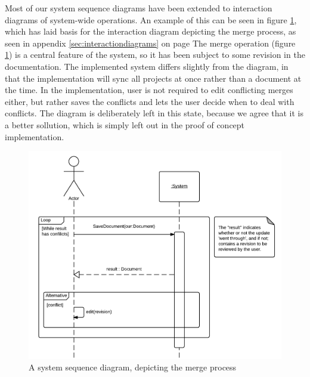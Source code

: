 Most of our system sequence diagrams have been extended to interaction diagrams of system-wide operations. 
An example of this can be seen in figure \ref{fig:merge-ssd}, 
which has laid basis for the interaction diagram depicting the merge process, 
as seen in appendix \ref{sec:interactiondiagrams} on page \pageref{fig:interaction-merge-diagram}
The merge operation (figure \ref{fig:merge-ssd}) is a central feature of the \SOP{} 
system, so it has been subject to some revision in the documentation.
The implemented system differs slightly from the diagram, in that the implementation will sync all projects at once rather than a document at the time. 
In the implementation, user is not required to edit conflicting merges either, but rather 
saves the conflicts and lets the user decide when to deal with conflicts.
The diagram is deliberately left in this state, because we agree that it is a better sollution, which is simply left out in the proof of concept \SOP{} implementation.

\begin{figure}[hbt]
	\centering
	\includegraphics[width=1\textwidth]{Software_analysis/graphics/Merge-ssd.png}
	\caption{A system sequence diagram, depicting the merge process}
	\label{fig:merge-ssd}
\end{figure}
